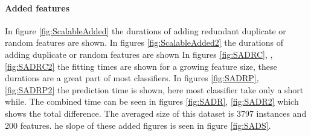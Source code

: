 \documentclass[a4paper,10pt]{article}
\begin{document}
\paragraph{Added features}
In figure \ref{fig:ScalableAdded} the durations of adding redundant duplicate or random features are shown. In figures \ref{fig:ScalableAdded2} the durations of adding duplicate or random features are shown In figures \ref{fig:SADRC}, ,\ref{fig:SADRC2} the fitting times are shown for a growing feature size, these durations are a great part of most classifiers. In figures \ref{fig:SADRP}, \ref{fig:SADRP2} the prediction time is shown, here most classifier take only a short while. The combined time can be seen in figures \ref{fig:SADR}, \ref{fig:SADR2} which shows the total difference.
The averaged size of this dataset is 3797 instances and 200 features. he slope of these added figures is seen in figure \ref{fig:SADS}.
\end{document}
